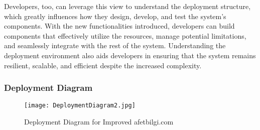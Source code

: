 \documentclass[12pt, letterpaper]{article}
\begin{document}
Developers, too, can leverage this view to understand the deployment structure, which greatly influences how they design, develop, and test the system's components. With the new functionalities introduced, developers can build components that effectively utilize the resources, manage potential limitations, and seamlessly integrate with the rest of the system. Understanding the deployment environment also aids developers in ensuring that the system remains resilient, scalable, and efficient despite the increased complexity.

\subsubsection{Deployment Diagram}

\begin{figure}[H]
\centering
\texttt{[image: DeploymentDiagram2.jpg]}
\caption{Deployment Diagram for Improved afetbilgi.com}
\end{figure}

\newpage
\end{document}
